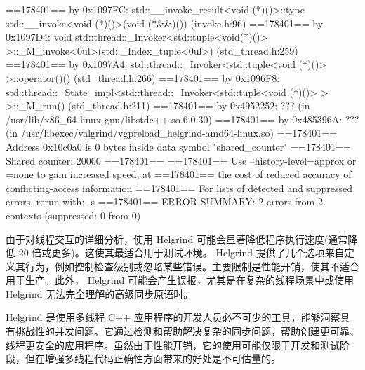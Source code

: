 \begin{shell}
==178401== by 0x1097FC: std::__invoke_result<void (*)()>::type
std::__invoke<void (*)()>(void (*&&)()) (invoke.h:96)
==178401== by 0x1097D4: void std::thread::_Invoker<std::tuple<void(*)()> >::_M_invoke<0ul>(std::_Index_tuple<0ul>) (std_thread.h:259)
==178401== by 0x1097A4: std::thread::_Invoker<std::tuple<void (*)()> >::operator()() (std_thread.h:266)
==178401== by 0x1096F8: std::thread::_State_impl<std::thread::_Invoker<std::tuple<void (*)()> > >::_M_run() (std_thread.h:211)
==178401== by 0x4952252: ??? (in /usr/lib/x86_64-linux-gnu/libstdc++.so.6.0.30)
==178401== by 0x485396A: ??? (in /usr/libexec/valgrind/vgpreload_helgrind-amd64-linux.so)
==178401== Address 0x10c0a0 is 0 bytes inside data symbol "shared_counter"
==178401==
Shared counter: 20000
==178401==
==178401== Use --history-level=approx or =none to gain increased
speed, at
==178401== the cost of reduced accuracy of conflicting-access
information
==178401== For lists of detected and suppressed errors, rerun with: -s
==178401== ERROR SUMMARY: 2 errors from 2 contexts (suppressed: 0 from
0)
\end{shell}


由于对线程交互的详细分析，使用 Helgrind 可能会显著降低程序执行速度(通常降低 20 倍或更多)。这使其最适合用于测试环境。 Helgrind 提供了几个选项来自定义其行为，例如控制检查级别或忽略某些错误。主要限制是性能开销，使其不适合用于生产。此外， Helgrind 可能会产生误报，尤其是在复杂的线程场景中或使用 Helgrind 无法完全理解的高级同步原语时。

Helgrind 是使用多线程 C++ 应用程序的开发人员必不可少的工具，能够洞察具有挑战性的并发问题。它通过检测和帮助解决复杂的同步问题，帮助创建更可靠、线程更安全的应用程序。虽然由于性能开销，它的使用可能仅限于开发和测试阶段，但在增强多线程代码正确性方面带来的好处是不可估量的。






















